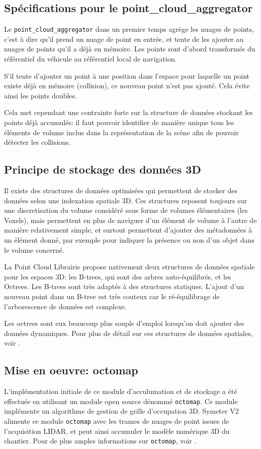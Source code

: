 \documentclass[12pt,a4paper]{report}
\begin{document}
		\subsection{Spécifications pour le point\_cloud\_aggregator}
		Le \verb|point_cloud_aggregator| dans un premier temps agrège les nuages de points, c'est à dire qu'il prend un nuage de point en entrée, et tente de les ajouter au nuages de points qu'il a déjà en mémoire. Les points sont d'abord transformés du référentiel du véhicule au référentiel local de navigation. 
		
		\para S'il tente d'ajouter un point à une position dans l'espace pour laquelle un point existe déjà en mémoire (collision), ce nouveau point n'est pas ajouté. Cela évite ainsi les points doubles.
		
		\para Cela met cependant une contrainte forte sur la structure de données stockant les points déjà accumulés: il faut pouvoir identifier de manière unique tous les éléments de volume inclus dans la représentation de la scène afin de pouvoir détecter les collisions.
		

		
		\subsection{Principe de stockage des données 3D}
		Il existe des structures de données optimisées qui permettent de stocker des données selon une indexation spatiale 3D. Ces structures reposent toujours sur une discretisation du volume considéré sous forme de volumes élémentaires (les Voxels), mais permettent en plus de naviguer d'un élément de volume à l'autre de manière relativement simple, et surtout permettent d'ajouter des métadonnées à un élément donné, par exemple pour indiquer la présence ou non d'un objet dans le volume concerné.
		
		\para La Point Cloud Librairie propose nativement deux structures de données spatiale pour les espaces 3D: les B-trees, qui sont des arbres auto-équilibrés, et les Octrees. Les B-trees sont très adaptés à des structures statiques. L'ajout d'un nouveau point dans un B-tree est très couteux car le ré-équilibrage de l'arborescence de données est complexe.
		
		\para Les octrees sont eux beaucoup plus souple d'emploi lorsqu'on doit ajouter des données dynamiques. Pour plus de détail sur ces structures de données spatiales, voir \cite{shekhar_encyclopedia_2017}.
		
		\subsection{Mise en oeuvre: octomap}
		L'implémentation initiale de ce module d'acculumation et de stockage a été effectuée en utilisant un module open source dénommé \verb|octomap|. Ce module implémente un algorithme de gestion de grille d'occupation 3D. Symeter V2 alimente ce module \verb|octomap| avec les trames de nuages de point issues de l'acquisition LIDAR, et peut ainsi accumuler le modèle numérique 3D du chantier. Pour de plus amples informations sur \verb|octomap|, voir \cite{hornung_octomap:_2013}.
		
\end{document}
